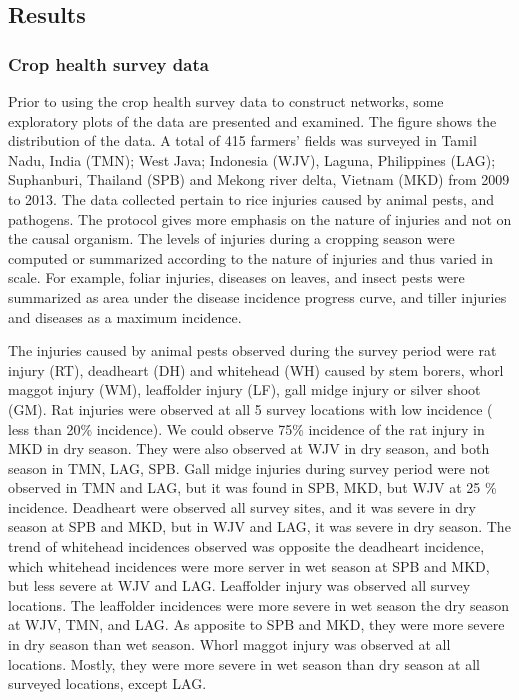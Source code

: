 
\subsection{Results}

\subsubsection{Crop health survey data}

Prior to using the crop health survey data to construct networks, some exploratory plots of the data are presented and examined. The figure shows the distribution of the data. A total of 415 farmers' fields was surveyed in Tamil Nadu, India (TMN); West Java; Indonesia (WJV), Laguna, Philippines (LAG); Suphanburi, Thailand (SPB) and Mekong river delta, Vietnam (MKD) from 2009 to 2013. The data collected pertain to rice injuries caused by animal pests, and pathogens. The protocol gives more emphasis on the nature of injuries and not on the causal organism. The levels of injuries during a cropping season were computed or summarized according to the nature of injuries and thus varied in scale. For example, foliar injuries, diseases on leaves, and insect pests were summarized as area under the disease incidence progress curve, and tiller injuries and diseases as a maximum incidence. 

The injuries caused by animal pests observed during the survey period were rat injury (RT), deadheart (DH) and whitehead (WH) caused by stem borers, whorl maggot injury (WM), leaffolder injury (LF), gall midge injury or silver shoot (GM). Rat injuries were observed at all 5 survey locations with low incidence ( less than 20\% incidence). We could observe 75\% incidence of the rat injury in MKD in dry season. They were also observed at WJV in dry season, and both season in TMN, LAG, SPB. Gall midge injuries during survey period were not observed in TMN and LAG, but it was found in SPB, MKD, but WJV at 25 \% incidence. Deadheart were observed all survey sites, and it was severe in dry season at SPB and MKD, but in WJV and LAG, it was severe in dry season. The trend of whitehead incidences observed was opposite the deadheart incidence, which whitehead incidences were more server in wet season at SPB and MKD, but less severe at WJV and LAG. Leaffolder injury was observed all survey locations. The leaffolder incidences were more severe in wet season the dry season at WJV, TMN, and LAG. As apposite to SPB and MKD, they were more severe in dry season than wet season. Whorl maggot injury was observed at all locations. Mostly, they were more severe in wet season than dry season at all surveyed locations, except LAG.

